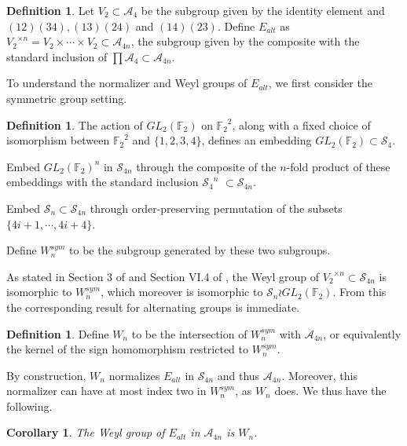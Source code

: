 \documentclass{article}
\theoremstyle{plain}
\newtheorem{corollary}[theorem]{Corollary}
\theoremstyle{definition}
\newtheorem{definition}[theorem]{Definition}
\newcommand{\F}{\mathbb{F}}
\newcommand{\si}{\mathcal{S}}
\newcommand{\alt}{\mathcal{A}}
\begin{document}
\begin{definition}
    Let $V_2 \subset \alt_4$ be the subgroup given by the identity element and $(12)(34), (13)(24)$ and $(14)(23)$.  Define $E_{alt}$ as  ${V_2}^{\times n} = V_2 \times \cdots \times V_2 \subset \alt_{4n}$,  
 the subgroup given by the composite 
 with the standard inclusion of $\prod \alt_4 \subset \alt_{4n}$. 
\end{definition}  


To understand the normalizer and Weyl groups of $E_{alt}$, we first consider
the symmetric group setting.  

\begin{definition}
    The action of $GL_2( \F_2)$ 
    on ${ \F_2}^2$, along with a fixed choice of isomorphism 
    between ${ \F_2}^2$ and $\{1, 2, 3, 4\}$,
    defines an embedding $GL_2( \F_2) \subset \si_4$.

     Embed  ${GL_2( \F_2)}^n$ in $\si_{4n}$ through the composite of the $n$-fold product of these embeddings  with the standard inclusion ${\si_4}^{n}$ $ \subset \si_{4n}$. 
     
    Embed
    $\si_n \subset \si_{4n}$ through order-preserving
    permutation of the subsets $\{4i+1, \cdots, 4i + 4\}$. 
    
    Define $W_n^{sym}$ to be the subgroup generated by these two subgroups.

\end{definition}

As stated in 
Section 3 of \cite{MaMi79} and
Section VI.4 of \cite{AdMi94},
    the Weyl group of ${V_2}^{\times n} \subset \si_{4n}$ is isomorphic to $W_n^{sym}$, which moreover is isomorphic to $\si_n \wr GL_2( \F_2)$.
From this the corresponding result for alternating groups  is immediate.

\begin{definition}
    Define $W_n$ to be the intersection of $W_n^{sym}$ with $\alt_{4n}$,
    or equivalently the kernel of the sign homomorphism restricted to
    $W_n^{sym}$.
\end{definition}


 By construction, $W_n$ normalizes $E_{alt}$ in $\si_{4n}$ and 
thus $\alt_{4n}$.  Moreover, this normalizer can have at most index two in
$W_n^{sym}$, as $W_n$ does.  We thus have the following.

\begin{corollary}
    The Weyl group of $E_{alt}$ in $\alt_{4n}$ is $W_n$.
\end{corollary}
    
\end{document}
